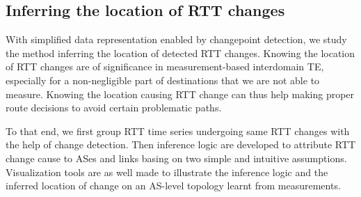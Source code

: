 \subsection{Inferring the location of RTT changes}
With simplified data representation enabled by changepoint detection, we study the method inferring the location of detected RTT changes.
Knowing the location of RTT changes are of significance in measurement-based interdomain TE,  especially for a non-negligible part of destinations that we are not able to measure. Knowing the location causing RTT change can thus help making proper route decisions to avoid certain problematic paths.

To that end, we first group RTT time series undergoing same RTT changes with the help of change detection.
Then inference logic are developed to attribute RTT change cause to ASes and links basing on two simple and intuitive assumptions.
Visualization tools are as well made to illustrate the inference logic and the inferred location of change on an AS-level topology learnt from measurements.
